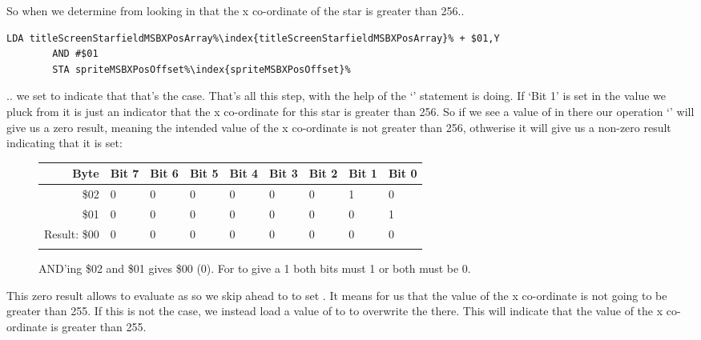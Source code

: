 So when
we determine from looking in  that the x co-ordinate of the star is greater
than 256..

\begin{lstlisting}[escapechar=\%]
        LDA titleScreenStarfieldMSBXPosArray%\index{titleScreenStarfieldMSBXPosArray}% + $01,Y
        AND #$01
        STA spriteMSBXPosOffset%\index{spriteMSBXPosOffset}%
\end{lstlisting}

.. we set  to indicate that that's the case. That's all this step, with the help
of the `' statement is doing. If `Bit 1' is
set in the value we pluck from  it is just an indicator that the x co-ordinate
for this star is greater than 256. So if we see a value of  in there our operation `' will
give us a zero result, meaning the intended value of the x co-ordinate is not greater than 256, othwerise it will give
us a non-zero result indicating that it is set:

\begin{figure}[H]
  {
    \setlength{\tabcolsep}{3.0pt}
    \setlength\cmidrulewidth{\heavyrulewidth} %
    \begin{adjustbox}{width=10cm,center}

      \begin{tabular}{rllllllll}
        \toprule
        Byte & Bit 7 & Bit 6 & Bit 5 & Bit 4 & Bit 3 & Bit 2 & Bit 1 & Bit 0        \\
        \midrule
        \$02 & 0 & 0 & 0 & 0 & 0 & 0 & 1 & 0 \\
        \$01 & 0 & 0 & 0 & 0 & 0 & 0 & 0 & 1 \\
        \midrule
        Result: \$00 & 0 & 0 & 0 & 0 & 0 & 0 & 0 & 0 \\
        \addlinespace
        \bottomrule
      \end{tabular}
    \end{adjustbox}
  }\caption*{AND'ing \$02 and \$01 gives \$00 (0). For  to give a 1 both bits must 1 or both must be 0.}
\end{figure}

This zero result allows  to evaluate as  so we skip ahead to 
to set .
It means for us that the value of the x co-ordinate is not going to be greater than 255. If this is not the case, we instead load a value of
 to  to overwrite the  there. This will indicate that the value of the x co-ordinate
is greater than 255.

